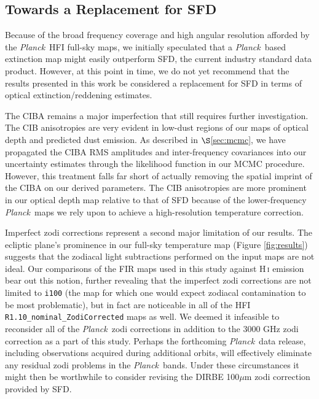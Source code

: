 \documentclass{emulateapj}
\newcommand{\PLANCK}{{\it Planck}}
\begin{document}

\subsection{Towards a Replacement for SFD}
\label{sec:replace}
Because of the broad frequency coverage and high angular resolution afforded
by the \PLANCK~HFI full-sky maps, we initially speculated that a \PLANCK~based 
extinction map might easily outperform SFD, the current industry standard data 
product. However, at this point in time, we do not yet recommend that the 
results presented in this work be considered a replacement for SFD in terms of 
optical extinction/reddening estimates.

The CIBA remains a major imperfection that still requires further 
investigation. The CIB anisotropies are very evident in low-dust regions of our
maps of optical depth and predicted dust emission. As described in 
$\S$\ref{sec:mcmc}, we have propagated the CIBA RMS amplitudes and 
inter-frequency covariances into our uncertainty estimates through the 
likelihood function in our MCMC procedure. However, this treatment falls far 
short of actually removing the spatial imprint of the CIBA on our derived 
parameters. The CIB anisotropies are more prominent in our optical depth map 
relative to that of SFD because of the lower-frequency \PLANCK~maps we rely 
upon to achieve a high-resolution temperature correction.

Imperfect zodi corrections represent a second major limitation of our results.
The ecliptic plane's prominence in our full-sky temperature map (Figure 
\ref{fig:results}) suggests that the zodiacal light subtractions performed on 
the input maps are not ideal. Our comparisons of the FIR maps used in this 
study against H\,\textsc{i} emission bear out this notion, further revealing 
that the imperfect zodi corrections are not limited to \verb|i100| (the 
map for which one would expect zodiacal contamination to be most 
problematic), but in fact are noticeable in all of the HFI 
\verb|R1.10_nominal_ZodiCorrected| maps as well. We deemed it infeasible to 
reconsider all of the \PLANCK~zodi corrections in addition to the 3000 GHz zodi
correction as a part of this study. Perhaps the forthcoming \PLANCK~data 
release, including observations acquired during additional orbits, will 
effectively eliminate any residual zodi problems in the \PLANCK~bands. Under 
these circumstances it might then be worthwhile to consider revising the DIRBE 
100$\mu$m zodi correction provided by SFD.
\end{document}
